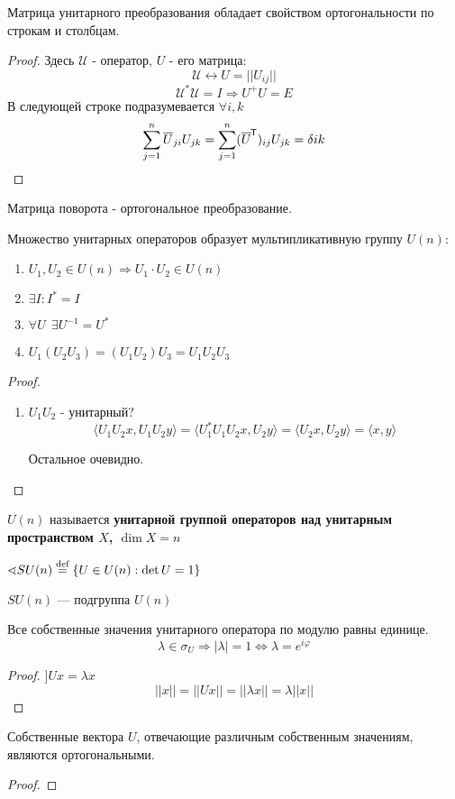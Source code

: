 \begin{lemma}
    Матрица унитарного преобразования обладает свойством ортогональности по строкам и столбцам.
\end{lemma}
\begin{proof}
    Здесь $\mathcal U$ - оператор, $U$ - его матрица:
    $$\mathcal U \leftrightarrow U=||U_{ij}||$$
    $$\mathcal U^* \mathcal U=I \Rightarrow U^+U = E$$
    В следующей строке подразумевается $\forall i,k$
    $$\sum_{j=1}^n \overline U_{ji}U_{jk}=\sum_{j=1}^n (\overline U^{\mkern-1.5mu\mathsf{T}} )_{ij} U_{jk} = \delta{ik}$$
\end{proof}
\begin{example}
    Матрица поворота - ортогональное преобразование.
\end{example}
\begin{lemma}
    Множество унитарных операторов образует мультипликативную группу $U(n)$:
    \begin{enumerate}
        \item $U_1, U_2\in U(n) \Rightarrow U_1\cdot U_2\in U(n)$
        \item $\exists I : I^*=I$
        \item $\forall U \ \ \exists U^{-1} = U^*$
        \item $U_1(U_2U_3)=(U_1U_2)U_3=U_1U_2U_3$
    \end{enumerate}
\end{lemma}
\begin{proof}
    \begin{enumerate}
        \item $U_1U_2$ - унитарный?
              $$\langle U_1U_2x, U_1U_2y \rangle = \langle U_1^*U_1U_2x, U_2y \rangle = \langle U_2 x, U_2 y\rangle = \langle x, y\rangle$$

              Остальное очевидно.
    \end{enumerate}
\end{proof}

$U(n)$ называется \textbf{унитарной группой операторов над унитарным пространством $X$, $\dim X = n$}

$\sphericalangle SU(n) \stackrel{\text{def}}{=} \{U\in U(n) : \det U = 1\}$

\begin{lemma}
    $SU(n)$ --- подгруппа $U(n)$
\end{lemma}
\begin{lemma}
    Все собственные значения унитарного оператора по модулю равны единице.
    $$\lambda\in \sigma_U \Rightarrow |\lambda|=1 \Leftrightarrow \lambda = e^{i\varphi}$$
\end{lemma}
\begin{proof}
    $] Ux = \lambda x$
    $$||x||=||Ux||=||\lambda x||=\lambda ||x||$$
\end{proof}
\begin{lemma}
    Собственные вектора $U$, отвечающие различным собственным значениям, являются ортогональными.
\end{lemma}
\begin{proof}
\end{proof}

